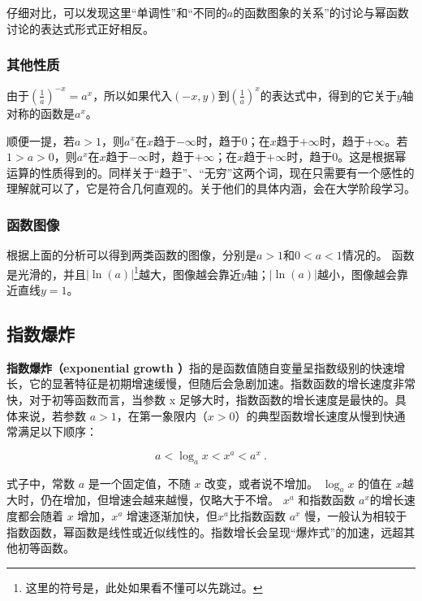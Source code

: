 仔细对比，可以发现这里“单调性”和“不同的$a$的函数图象的关系”的讨论与幂函数讨论的表达式形式正好相反。

\subsubsection{其他性质}

由于$\displaystyle \left(\frac{1}{a}\right)^{-x}=a^{x}$，所以如果代入$(-x,y)$到$\displaystyle\left(\frac{1}{a}\right)^{x}$的表达式中，得到的它关于$y$轴对称的函数是$a^{x}$。

顺便一提，若$a>1$，则$a^x$在$x$趋于$-\infty$时，趋于$0$；在$x$趋于$+\infty$时，趋于$+\infty$。若$1>a>0$，则$a^x$在$x$趋于$-\infty$时，趋于$+\infty$；在$x$趋于$+\infty$时，趋于$0$。这是根据幂运算的性质得到的。同样关于“趋于”、“无穷”这两个词，现在只需要有一个感性的理解就可以了，它是符合几何直观的。关于他们的具体内涵，会在大学阶段学习。

\subsubsection{函数图像}

根据上面的分析可以得到两类函数的图像，分别是$a>1$和$0<a<1$情况的。
函数是光滑的，并且$|\ln(a)|$\footnote{这里的符号是，此处如果看不懂可以先跳过。}越大，图像越会靠近$y$轴；$|\ln(a)|$越小，图像越会靠近直线$y=1$。

\subsection{指数爆炸}

\textbf{指数爆炸（exponential growth ）}指的是函数值随自变量呈指数级别的快速增长，它的显著特征是初期增速缓慢，但随后会急剧加速。指数函数的增长速度非常快，对于初等函数而言，当参数 x 足够大时，指数函数的增长速度是最快的。具体来说，若参数 $a > 1$，在第一象限内（$x > 0$）的典型函数增长速度从慢到快通常满足以下顺序：

\begin{equation}
 a < \log_a{x} <x^a < a^x~.
\end{equation}

式子中，常数 $a$ 是一个固定值，不随 $x$ 改变，或者说不增加。 $\log_a{x}$ 的值在 $x$越大时，仍在增加，但增速会越来越慢，仅略大于不增。 $x^a$ 和指数函数 $a^x$的增长速度都会随着 $x$ 增加，$x^a$ 增速逐渐加快，但$x^a$比指数函数 $a^x$ 慢，一般认为相较于指数函数，幂函数是线性或近似线性的。指数增长会呈现“爆炸式”的加速，远超其他初等函数。

